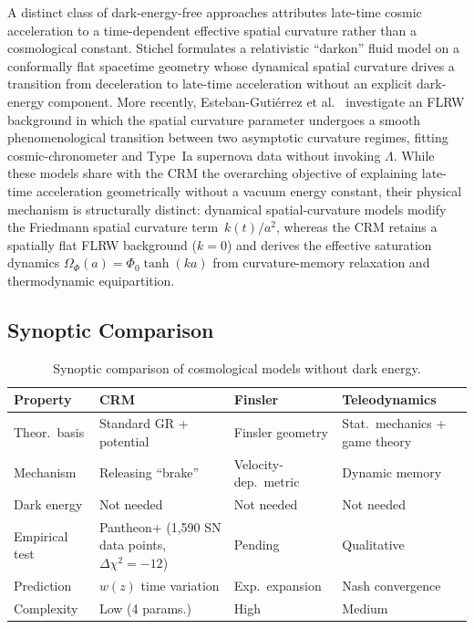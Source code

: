 \documentclass[aps,prd,twocolumn,superscriptaddress,nofootinbib]{revtex4-2}
\begin{document}
A distinct class of dark-energy-free approaches attributes late-time cosmic acceleration to a time-dependent effective spatial curvature rather than a cosmological constant. Stichel \cite{Stichel2016} formulates a relativistic ``darkon'' fluid model on a conformally flat spacetime geometry whose dynamical spatial curvature drives a transition from deceleration to late-time acceleration without an explicit dark-energy component. More recently, Esteban-Guti\'errez et al.\ \cite{EstebanGutierrez2025} investigate an FLRW background in which the spatial curvature parameter undergoes a smooth phenomenological transition between two asymptotic curvature regimes, fitting cosmic-chronometer and Type~Ia supernova data without invoking $\Lambda$. While these models share with the CRM the overarching objective of explaining late-time acceleration geometrically without a vacuum energy constant, their physical mechanism is structurally distinct: dynamical spatial-curvature models modify the Friedmann spatial curvature term~$k(t)/a^2$, whereas the CRM retains a spatially flat FLRW background ($k = 0$) and derives the effective saturation dynamics $\Omega_\Phi(a) = \Phi_0 \tanh(k a)$ from curvature-memory relaxation and thermodynamic equipartition.


\subsection{Synoptic Comparison}
\label{subsec:synopse}

\begin{table}[htbp]
\centering
\caption{Synoptic comparison of cosmological models without dark energy.}
\label{tab:synopse}
\begin{tabular}{llll}
\toprule
\textbf{Property} & \textbf{CRM} & \textbf{Finsler} & \textbf{Teleodynamics} \\
\midrule
Theor.\ basis & Standard GR + potential & Finsler geometry & Stat.\ mechanics + game theory \\
Mechanism & Releasing ``brake'' & Velocity-dep.\ metric & Dynamic memory \\
Dark energy & Not needed & Not needed & Not needed \\
Empirical test & Pantheon+ (1,590 SN data points, $\Delta\chi^2{=}{-}12$) & Pending & Qualitative \\
Prediction & $w(z)$ time variation & Exp.\ expansion & Nash convergence \\
Complexity & Low (4 params.) & High & Medium \\
\bottomrule
\end{tabular}
\end{table}
\end{document}
